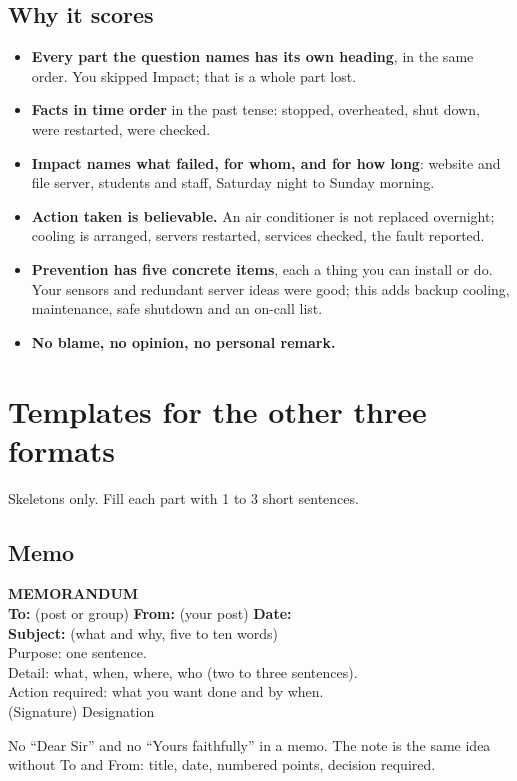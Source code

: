 \documentclass[11pt,a4paper]{article}
\begin{document}
\subsection{Why it scores}
\begin{itemize}
\item \textbf{Every part the question names has its own heading}, in the same order. You skipped Impact; that is a whole part lost.
\item \textbf{Facts in time order} in the past tense: stopped, overheated, shut down, were restarted, were checked.
\item \textbf{Impact names what failed, for whom, and for how long}: website and file server, students and staff, Saturday night to Sunday morning.
\item \textbf{Action taken is believable.} An air conditioner is not replaced overnight; cooling is arranged, servers restarted, services checked, the fault reported.
\item \textbf{Prevention has five concrete items}, each a thing you can install or do. Your sensors and redundant server ideas were good; this adds backup cooling, maintenance, safe shutdown and an on-call list.
\item \textbf{No blame, no opinion, no personal remark.}
\end{itemize}

\section{Templates for the other three formats}
Skeletons only. Fill each part with 1 to 3 short sentences.

\subsection{Memo}
\begin{shaded}
\small
\textbf{MEMORANDUM}\\
\textbf{To:} (post or group) \quad \textbf{From:} (your post) \quad \textbf{Date:}\\
\textbf{Subject:} (what and why, five to ten words)\\[3pt]
Purpose: one sentence.\\
Detail: what, when, where, who (two to three sentences).\\
Action required: what you want done and by when.\\[3pt]
(Signature) \hspace{1em} Designation
\end{shaded}
No ``Dear Sir'' and no ``Yours faithfully'' in a memo. The note is the same idea without To and From: title, date, numbered points, decision required.
\end{document}
